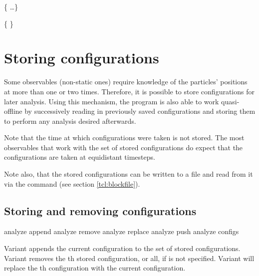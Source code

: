 \begin{essyntex}
\begin{code}
  \{   \dots \}
\end{code}

\begin{code}
  \{    \}
\end{code}

\section{Storing configurations}
\label{sec:stored-configs}

Some observables (\ie non-static ones) require knowledge of the
particles' positions at more than one or two times. Therefore, it is
possible to store configurations for later analysis.  Using this
mechanism, the program is also able to work quasi-offline by
successively reading in previously saved configurations and storing
them to perform any analysis desired afterwards.

Note that the time at which configurations were taken is not
stored.  The most observables that work with the set of stored
configurations do expect that the configurations are taken at
equidistant timesteps.

Note also, that the stored configurations can be written to a file and
read from it via the  command (see section
\vref{tcl:blockfile}).

\subsection{Storing and removing configurations}
\label{analyze:append}
\label{analyze:push}
\label{analyze:replace}
\label{analyze:remove}

\begin{essyntax}
   analyze append
   analyze remove 
   analyze replace  
   analyze push 
   analyze configs 
\end{essyntax}

Variant  appends the current configuration to the set of
stored configurations.  Variant  removes the th
stored configuration, or all, if  is not specified.  Variant
 will replace the th configuration with the
current configuration.


\end{essyntex}
